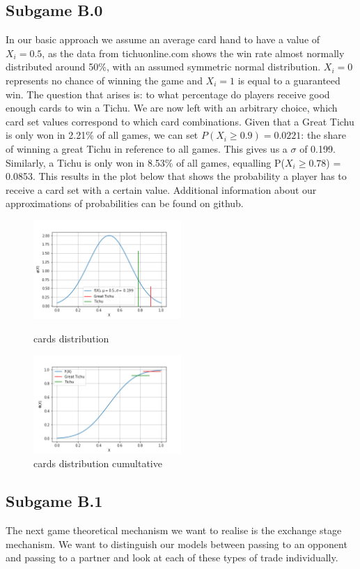 \subsection{Subgame B.0}
In our basic approach we assume an average card hand to have a value of $X_i = 0.5$, as the data from tichuonline.com shows the win rate almost normally distributed around 50$\%$, with an assumed symmetric normal distribution. $X_i = 0$ represents no chance of winning the game and $X_i = 1$ is equal to a guaranteed win. The question that arises is: to what percentage do players receive good enough cards to win a Tichu. We are now left with an arbitrary choice, which card set values correspond to which card combinations. Given that a Great Tichu is only won in 2.21$\%$ of all games, we can set $P(X_i \geq 0.9) = 0.0221$: the share of winning a great Tichu in reference to all games. This gives us a $\sigma$ of 0.199. Similarly, a Tichu is only won in 8.53$\%$ of all games, equalling P($X_i\geq 0.78$) = 0.0853. This results in the plot below that shows the probability a player has to receive a card set with a certain value. Additional information about our approximations of probabilities can be found on github.

\begin{figure}[h]
    \centering
    \includegraphics[width=0.5\textwidth]{Bilder/cards_distribution}
    \caption{cards distribution}
    \label{fig:2}
    \centering
    \includegraphics[width=0.5\textwidth]{Bilder/cards_distribution_cumultative}
    \caption{cards distribution cumultative}
    \label{fig:3}
\end{figure}
\subsection{Subgame B.1}
The next game theoretical mechanism we want to realise is the exchange stage mechanism. We want to distinguish our models between passing to an opponent and passing to a partner and look at each of these types of trade individually. 

